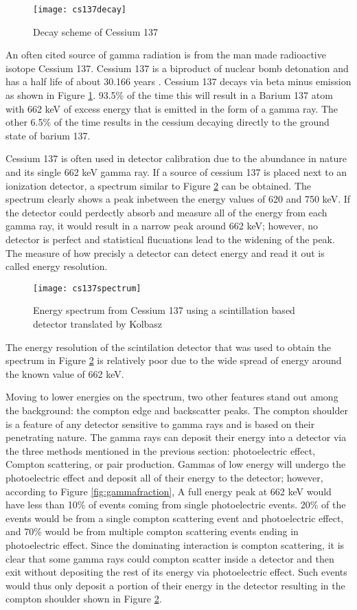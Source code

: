 \begin{figure}[htpb]
\centering
\texttt{[image: cs137decay]}
\caption{Decay scheme of Cessium 137}
\label{fig:cs137decay}
\end{figure}
An often cited source of gamma radiation is from the man made radioactive isotope Cessium 137.
Cessium 137 is a biproduct of nuclear bomb detonation and has a half life of about 30.166 years \cite{1992NIMPA}.
Cessium 137 decays via beta minus emission as shown in Figure \ref{fig:cs137decay}.
93.5\% of the time this will result in a Barium 137 atom with 662 keV of excess energy that is emitted in the form of a gamma ray.
The other 6.5\% of the time results in the cessium decaying directly to the ground state of barium 137.

Cessium 137 is often used in detector calibration due to the abundance in nature and its single 662 keV gamma ray.
If a source of cessium 137 is placed next to an ionization detector, a spectrum similar to Figure \ref{fig:cs137spectrum} can be obtained.
The spectrum clearly shows a peak inbetween the energy values of 620 and 750 keV.
If the detector could perdectly absorb and measure all of the energy from each gamma ray, it would result in a narrow peak around 662 keV; however, no detector is perfect and statistical flucuations lead to the widening of the peak.
The measure of how precisly a detector can detect energy and read it out is called energy resolution.
\begin{figure}[htpb]
\centering
\texttt{[image: cs137spectrum]}
\caption{Energy spectrum from Cessium 137 using a scintillation based detector \cite{CS137SPEC} translated by Kolbasz}
\label{fig:cs137spectrum}
\end{figure}
The energy resolution of the scintilation detector that was used to obtain the spectrum in Figure \ref{fig:cs137spectrum} is relatively poor due to the wide spread of energy around the known value of 662 keV.

Moving to lower energies on the spectrum, two other features stand out among the background: the compton edge and backscatter peaks.
The compton shoulder is a feature of any detector sensitive to gamma rays and is based on their penetrating nature.
The gamma rays can deposit their energy into a detector via the three methods mentioned in the previous section: photoelectric effect, Compton scattering, or pair production.
Gammas of low energy will undergo the photoelectric effect and deposit all of their energy to the detector; however, according to Figure \ref{fig:gammafraction}, A full energy peak at 662 keV would have less than 10\% of events coming from single photoelectric events.
20\% of the events would be from a single compton scattering event and photoelectric effect, and 70\% would be from multiple compton scattering events ending in photoelectric effect.
Since the dominating interaction is compton scattering, it is clear that some gamma rays could compton scatter inside a detector and then exit without depositing the rest of its energy via photoelectric effect.
Such events would thus only deposit a portion of their energy in the detector resulting in the compton shoulder shown in Figure \ref{fig:cs137spectrum}.

